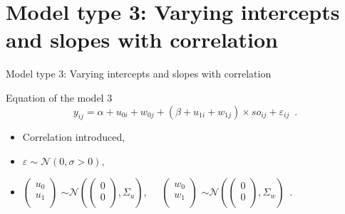 \documentclass[unknownkeysallowed]{beamer}
\begin{document}
\section{Model type 3: Varying intercepts and slopes with correlation}

\begin{frame}[plain]{}
    \begin{center}
        \LARGE Model type 3: Varying intercepts and slopes with correlation
    \end{center}
\end{frame}

\addtocounter{framenumber}{-1}
\begin{frame}{Equation of the model 3}
{\[y_{ij}=\alpha + u_{0i} + w_{0j} + (\beta + u_{1i} + w_{1j})\times so_{ij}+\varepsilon_{ij}\enspace.\]}

\medskip \medskip

 \begin{itemize}
        \item Correlation introduced,
        \item $\varepsilon \sim \mathcal{N}(0,\sigma>0),$
        \item $\begin{pmatrix}
        u_0 \\
        u_1 \\
        \end{pmatrix}$ $\sim \mathcal{N}\left(\begin{pmatrix}
        0 \\
        0 \\
        \end{pmatrix}, \Sigma_u\right), \quad$  $\begin{pmatrix}
        w_0 \\
        w_1 \\
        \end{pmatrix}$ $\sim \mathcal{N}\left(\begin{pmatrix}
        0 \\
        0 \\
        \end{pmatrix}, \Sigma_w\right)\enspace.$
    \end{itemize}
\end{frame}
\end{document}
